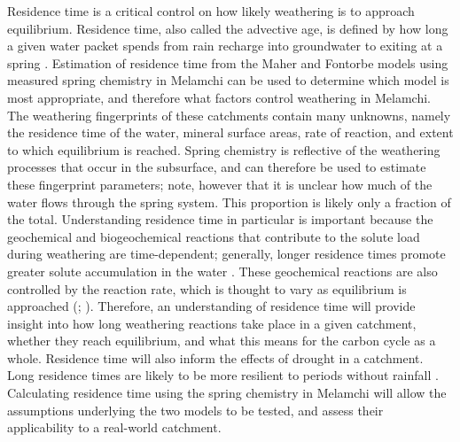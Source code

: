 Residence time is a critical control on how likely weathering is to approach equilibrium. Residence time, also called the advective age, is defined by how long a given water packet spends from rain recharge into groundwater to exiting at a spring \parencite{mccallumLimitationsUseEnvironmental2015}. Estimation of residence time from the Maher and Fontorbe models using measured spring chemistry in Melamchi can be used to determine which model is most appropriate, and therefore what factors control weathering in Melamchi. The weathering fingerprints of these catchments contain many unknowns, namely the residence time of the water, mineral surface areas, rate of reaction, and extent to which equilibrium is reached. Spring chemistry is reflective of the weathering processes that occur in the subsurface, and can therefore be used to estimate these fingerprint parameters; note, however that it is unclear how much of the water flows through the spring system. This proportion is likely only a fraction of the total. Understanding residence time in particular is important because the geochemical and biogeochemical reactions that contribute to the solute load during weathering are time-dependent; generally, longer residence times promote greater solute accumulation in the water \parencite{bernerRateControlMineral1978}. These geochemical reactions are also controlled by the reaction rate, which is thought to vary as equilibrium is approached (\cite{whiteEffectTimeWeathering2003}; \cite{maherRoleFluidResidence2011}). Therefore, an understanding of residence time will provide insight into how long weathering reactions take place in a given catchment, whether they reach equilibrium, and what this means for the carbon cycle as a whole. Residence time will also inform the effects of drought in a catchment. Long residence times are likely to be more resilient to periods without rainfall \parencite{atwoodCriticalZoneResponse2023}. Calculating residence time using the spring chemistry in Melamchi will allow the assumptions underlying the two models to be tested, and assess their applicability to a real-world catchment.

\bsk


